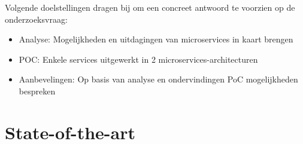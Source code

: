 Volgende doelstellingen dragen bij om een concreet antwoord te voorzien op de onderzoeksvraag:

\begin{itemize}
    \item Analyse: Mogelijkheden en uitdagingen van microservices in kaart brengen
    \item POC: Enkele services uitgewerkt in 2 microservices-architecturen 
    \item Aanbevelingen: Op basis van analyse en ondervindingen PoC mogelijkheden bespreken
\end{itemize}

    
%
%
%
%
%
%


\section{State-of-the-art}%
\label{sec:state-of-the-art}

